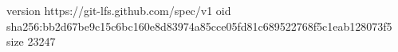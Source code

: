 version https://git-lfs.github.com/spec/v1
oid sha256:bb2d67be9c15c6bc160e8d83974a85cce05fd81c689522768f5c1eab128073f5
size 23247
